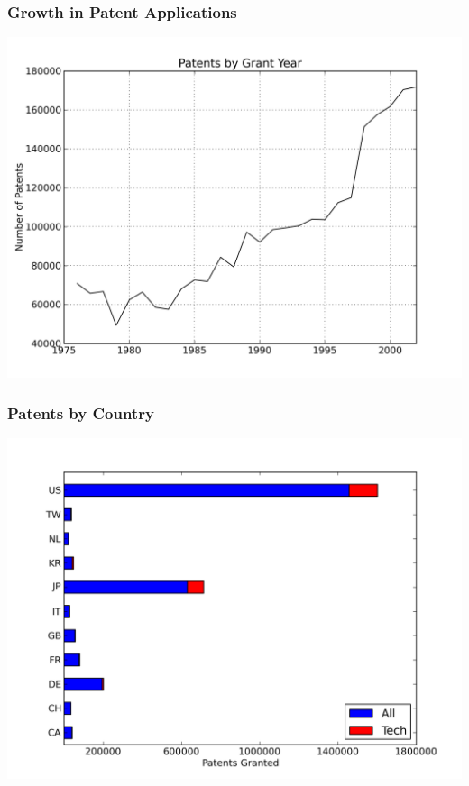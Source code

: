 \documentclass{beamer}
\begin{document}
\begin{frame}[t]\frametitle{Growth in Patent Applications} 

  \begin{center}
      \includegraphics[scale=.5]{grant_year.png}
      \label{fig:grant_year}
  \end{center}
\end{frame}

\begin{frame}[t]\frametitle{Patents by Country} 

\begin{center}
  \includegraphics[scale=.5]{by_country.png}
  \label{fig:by_country}
\end{center}
\end{frame}
\end{document}
